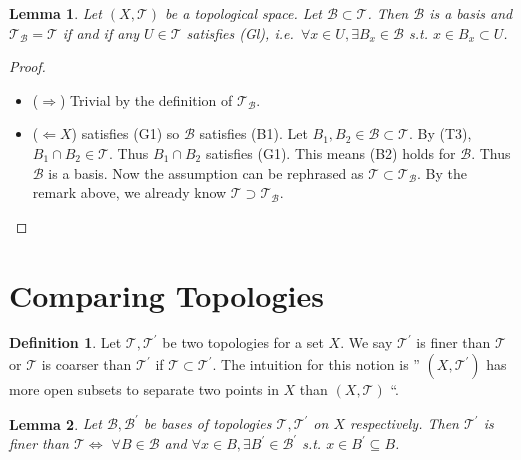 \documentclass[
]{book}
\newtheorem{lemma}{Lemma}[chapter]
\theoremstyle{definition}
\newtheorem{definition}{Definition}[chapter]
\theoremstyle{definition}
\theoremstyle{definition}
\theoremstyle{definition}
\theoremstyle{remark}
\begin{document}
\begin{lemma}
\protect\hypertarget{lem:lemma110}{}\label{lem:lemma110}Let \((X, \mathcal{T})\) be a topological space. Let \(\mathcal{B} \subset \mathcal{T}\). Then \(\mathcal{B}\) is a basis and \(\mathcal{T}_{\mathcal{B}}=\mathcal{T}\) if and if any \(U \in \mathcal{T}\) satisfies (Gl), i.e.~\(\forall x \in U, \exists B_{x} \in \mathcal{B}\) s.t. \(x \in B_{x} \subset U\).
\end{lemma}

\begin{proof}
\leavevmode

\begin{itemize}
\item
  (\(\Rightarrow\)) Trivial by the definition of \(\mathcal{T}_{\mathcal{B}}\).
\item
  (\(\Leftarrow X\)) satisfies (G1) so \(\mathcal{B}\) satisfies (B1). Let \(B_{1}, B_{2} \in \mathcal{B} \subset \mathcal{T}\). By (T3), \(B_{1} \cap B_{2} \in \mathcal{T}\). Thus \(B_{1} \cap B_{2}\) satisfies (G1). This means (B2) holds for \(\mathcal{B}\). Thus \(\mathcal{B}\) is a basis. Now the assumption can be rephrased as \(\mathcal{T} \subset \mathcal{T}_{\mathcal{B}}\). By the remark above, we already know \(\mathcal{T} \supset \mathcal{T}_{\mathcal{B}}\).
\end{itemize}

\end{proof}

\hypertarget{comparing-topologies}{%
\section{Comparing Topologies}\label{comparing-topologies}}

\begin{definition}
\protect\hypertarget{def:unnamed-chunk-16}{}\label{def:unnamed-chunk-16}Let \(\mathcal{T}, \mathcal{T}^{\prime}\) be two topologies for a set \(X\). We say \(\mathcal{T}^{\prime}\) is finer than \(\mathcal{T}\) or \(\mathcal{T}\) is coarser than \(\mathcal{T}^{\prime}\) if \(\mathcal{T} \subset \mathcal{T}^{\prime}\). The intuition for this notion is '' \(\left(X, \mathcal{T}^{\prime}\right)\) has more open subsets to separate two points in \(X\) than \((X, \mathcal{T})\) ``.
\end{definition}

\begin{lemma}
\protect\hypertarget{lem:finerLemma}{}\label{lem:finerLemma}Let \(\mathcal{B}, \mathcal{B}^{\prime}\) be bases of topologies \(\mathcal{T}, \mathcal{T}^{\prime}\) on \(X\) respectively. Then \(\mathcal{T}^{\prime}\) is finer than \(\mathcal{T} \Leftrightarrow\) \(\forall B \in \mathcal{B}\) and \(\forall x \in B, \exists B^{\prime} \in \mathcal{B}^{\prime}\) s.t. \(x \in B^{\prime} \subseteq B\).
\end{lemma}
\end{document}
